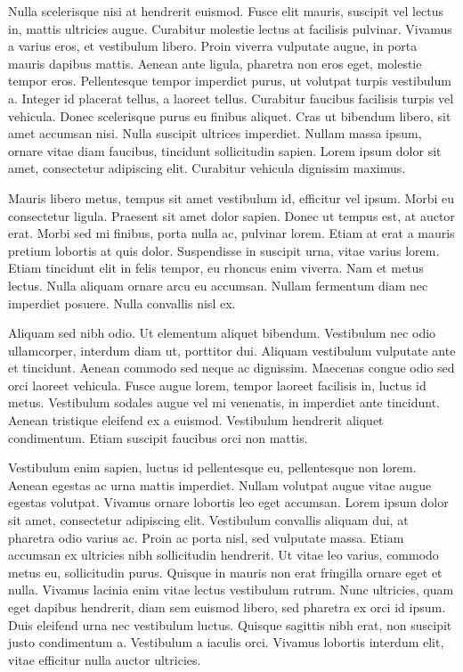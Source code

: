 \documentclass{homework}
\begin{document}
Nulla scelerisque nisi at hendrerit euismod. Fusce elit mauris, suscipit vel lectus in, mattis ultricies augue. Curabitur molestie lectus at facilisis pulvinar. Vivamus a varius eros, et vestibulum libero. Proin viverra vulputate augue, in porta mauris dapibus mattis. Aenean ante ligula, pharetra non eros eget, molestie tempor eros. Pellentesque tempor imperdiet purus, ut volutpat turpis vestibulum a. Integer id placerat tellus, a laoreet tellus. Curabitur faucibus facilisis turpis vel vehicula. Donec scelerisque purus eu finibus aliquet. Cras ut bibendum libero, sit amet accumsan nisi. Nulla suscipit ultrices imperdiet. Nullam massa ipsum, ornare vitae diam faucibus, tincidunt sollicitudin sapien. Lorem ipsum dolor sit amet, consectetur adipiscing elit. Curabitur vehicula dignissim maximus.

Mauris libero metus, tempus sit amet vestibulum id, efficitur vel ipsum. Morbi eu consectetur ligula. Praesent sit amet dolor sapien. Donec ut tempus est, at auctor erat. Morbi sed mi finibus, porta nulla ac, pulvinar lorem. Etiam at erat a mauris pretium lobortis at quis dolor. Suspendisse in suscipit urna, vitae varius lorem. Etiam tincidunt elit in felis tempor, eu rhoncus enim viverra. Nam et metus lectus. Nulla aliquam ornare arcu eu accumsan. Nullam fermentum diam nec imperdiet posuere. Nulla convallis nisl ex.

Aliquam sed nibh odio. Ut elementum aliquet bibendum. Vestibulum nec odio ullamcorper, interdum diam ut, porttitor dui. Aliquam vestibulum vulputate ante et tincidunt. Aenean commodo sed neque ac dignissim. Maecenas congue odio sed orci laoreet vehicula. Fusce augue lorem, tempor laoreet facilisis in, luctus id metus. Vestibulum sodales augue vel mi venenatis, in imperdiet ante tincidunt. Aenean tristique eleifend ex a euismod. Vestibulum hendrerit aliquet condimentum. Etiam suscipit faucibus orci non mattis.

Vestibulum enim sapien, luctus id pellentesque eu, pellentesque non lorem. Aenean egestas ac urna mattis imperdiet. Nullam volutpat augue vitae augue egestas volutpat. Vivamus ornare lobortis leo eget accumsan. Lorem ipsum dolor sit amet, consectetur adipiscing elit. Vestibulum convallis aliquam dui, at pharetra odio varius ac. Proin ac porta nisl, sed vulputate massa. Etiam accumsan ex ultricies nibh sollicitudin hendrerit. Ut vitae leo varius, commodo metus eu, sollicitudin purus. Quisque in mauris non erat fringilla ornare eget et nulla. Vivamus lacinia enim vitae lectus vestibulum rutrum. Nunc ultricies, quam eget dapibus hendrerit, diam sem euismod libero, sed pharetra ex orci id ipsum. Duis eleifend urna nec vestibulum luctus. Quisque sagittis nibh erat, non suscipit justo condimentum a. Vestibulum a iaculis orci. Vivamus lobortis interdum elit, vitae efficitur nulla auctor ultricies.
\end{document}
